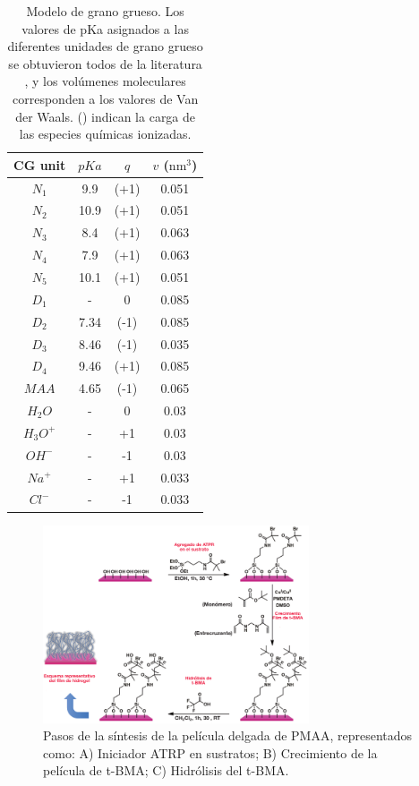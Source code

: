 \begin{table}[!ht]
	\begin{centering}
		\centering
		\setlength{\tabcolsep}{2.2pt}
		\begin{tabular}{|cccc|}
			\hline 
			\hspace{0pt}CG unit   & $pKa$ & $q$  & $v$ ($\text{nm}^3$)  \\ \hline
			$N_1$& 9.9 & (+1) &0.051\\
			$N_2$& 10.9& (+1) & 0.051\\ 
		     $N_3$& 8.4& (+1)& 0.063\\
		     $N_4$&7.9& (+1) & 0.063\\
		     $N_5$& 10.1& (+1)& 0.051\\
		      $D_1$&  - & 0 &0.085\\
		     $D_2$& 7.34 & (-1) & 0.085\\ 
			 $D_3$&  8.46& (-1)& 0.035\\
			$D_4$&  9.46 & (+1) &0.085\\ 
			$MAA$&  4.65 & (-1) & 0.065\\
			$H_2O$ & - & 0 & 0.03\\
			$H_3O^+$ & - & +1 & 0.03\\
			$OH^-$ & - & -1 & 0.03\\
			$Na^+$ & - & +1 & 0.033\\ 
			$Cl^-$ & - & -1 & 0.033\\ \hline
		\end{tabular}		
		\caption{Modelo de grano grueso. Los valores de pKa asignados a las diferentes unidades de grano grueso se obtuvieron todos de la literatura \cite{agostinelli2010polyamines,casero2009recent,puchem}, y los vol\'umenes moleculares corresponden a los valores de Van der Waals. \footnotesize{()} indican la carga de las especies qu\'imicas ionizadas.}
		\label{table:CG}
	\end{centering}
\end{table}



\begin{figure}[!htb]
	\centering
	\includegraphics[width=0.7\textwidth]{Figures/graph-film/exp_synt_scheme.pdf}
	\caption{Pasos de la síntesis de la pel\'icula delgada de PMAA, representados como: A) Iniciador ATRP en sustratos; B) Crecimiento de la pel\'icula de t-BMA; C) Hidr\'olisis del t-BMA.}
	\label{fig:film:synthesis_scheme}
\end{figure}




